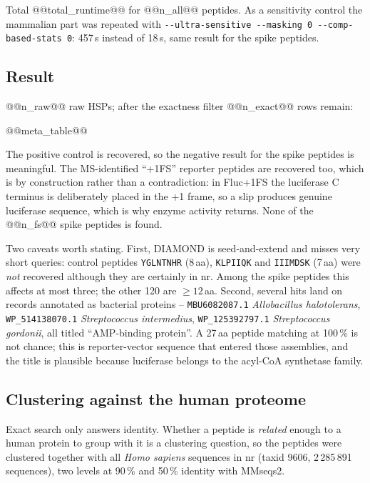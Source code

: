 \documentclass[11pt,a4paper]{article}
\begin{document}
Total @@total_runtime@@ for @@n_all@@ peptides. As a sensitivity control the
mammalian part was repeated with \texttt{-{}-ultra-sensitive -{}-masking 0
-{}-comp-based-stats 0}: 457\,s instead of 18\,s, same result for the spike
peptides.

\subsection{Result}

@@n_raw@@ raw HSPs; after the exactness filter @@n_exact@@ rows remain:

\footnotesize
@@meta_table@@
\normalsize

The positive control is recovered, so the negative result for the spike
peptides is meaningful. The MS-identified ``+1FS'' reporter peptides are
recovered too, which is by construction rather than a contradiction: in
Fluc+1FS the luciferase C terminus is deliberately placed in the +1 frame, so
a slip produces genuine luciferase sequence, which is why enzyme activity
returns. None of the @@n_fs@@ spike peptides is found.

Two caveats worth stating. First, DIAMOND is seed-and-extend and misses very
short queries: control peptides \texttt{YGLNTNHR} (8\,aa), \texttt{KLPIIQK}
and \texttt{IIIMDSK} (7\,aa) were \emph{not} recovered although they are
certainly in nr. Among the spike peptides this affects at most three; the
other 120 are $\geq 12$\,aa. Second, several hits land on records annotated as
bacterial proteins -- \texttt{MBU6082087.1} \emph{Allobacillus halotolerans},
\texttt{WP\_514138070.1} \emph{Streptococcus intermedius},
\texttt{WP\_125392797.1} \emph{Streptococcus gordonii}, all titled
``AMP-binding protein''. A 27\,aa peptide matching at 100\,\% is not chance;
this is reporter-vector sequence that entered those assemblies, and the title
is plausible because luciferase belongs to the acyl-CoA synthetase family.

\subsection{Clustering against the human proteome}

Exact search only answers identity. Whether a peptide is \emph{related} enough
to a human protein to group with it is a clustering question, so the peptides
were clustered together with all \emph{Homo sapiens} sequences in nr
(taxid 9606, 2\,285\,891 sequences), two levels at 90\,\% and 50\,\% identity
with MMseqs2.
\end{document}
